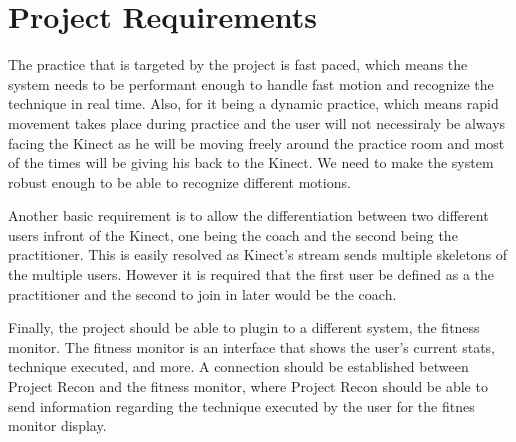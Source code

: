 \section{Project Requirements}
The practice that is targeted by the project is fast paced, which means the system needs to be performant enough to handle fast motion and recognize the technique in real time. Also, for it being a dynamic practice, which means rapid movement takes place during practice and the user will not necessiraly be always facing the Kinect as he will be moving freely around the practice room and most of the times will be giving his back to the Kinect. We need to make the system robust enough to be able to recognize different motions.

Another basic requirement is to allow the differentiation between two different users infront of the Kinect, one being the coach and the second being the practitioner. This is easily resolved as Kinect's stream sends multiple skeletons of the multiple users. However it is required that the first user be defined as a the practitioner and the second to join in later would be the coach.

Finally, the project should be able to plugin to a different system, the fitness monitor. The fitness monitor is an interface that shows the user's current stats, technique executed, and more. A connection should be established between Project Recon and the fitness monitor, where Project Recon should be able to send information regarding the technique executed by the user for the fitnes monitor display.